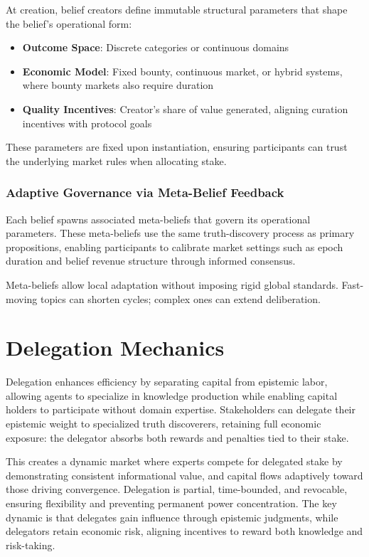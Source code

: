 \documentclass[11pt,a4paper]{article}
\begin{document}
At creation, belief creators define immutable structural parameters that shape the belief's operational form:

\begin{itemize}
\item \textbf{Outcome Space}: Discrete categories or continuous domains
\item \textbf{Economic Model}: Fixed bounty, continuous market, or hybrid systems, where bounty markets also require duration
\item \textbf{Quality Incentives}: Creator's share of value generated, aligning curation incentives with protocol goals
\end{itemize}

These parameters are fixed upon instantiation, ensuring participants can trust the underlying market rules when allocating stake.

\subsubsection{Adaptive Governance via Meta-Belief Feedback}

Each belief spawns associated meta-beliefs that govern its operational parameters. These meta-beliefs use the same truth-discovery process as primary propositions, enabling participants to calibrate market settings such as epoch duration and belief revenue structure through informed consensus.

Meta-beliefs allow local adaptation without imposing rigid global standards. Fast-moving topics can shorten cycles; complex ones can extend deliberation.

\section{Delegation Mechanics}

Delegation enhances efficiency by separating capital from epistemic labor, allowing agents to specialize in knowledge production while enabling capital holders to participate without domain expertise. Stakeholders can delegate their epistemic weight to specialized truth discoverers, retaining full economic exposure: the delegator absorbs both rewards and penalties tied to their stake.

This creates a dynamic market where experts compete for delegated stake by demonstrating consistent informational value, and capital flows adaptively toward those driving convergence. Delegation is partial, time-bounded, and revocable, ensuring flexibility and preventing permanent power concentration. The key dynamic is that delegates gain influence through epistemic judgments, while delegators retain economic risk, aligning incentives to reward both knowledge and risk-taking.
\end{document}

